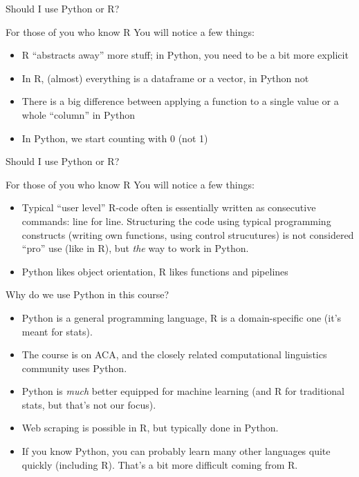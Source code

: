 \begin{frame}{Should I use Python or R?}
	\begin{block}{For those of you who know R}
		You will notice a few things:
		\begin{itemize}[<+>]
			\item R ``abstracts away'' more stuff; in Python, you need to be a bit more explicit
			\item In R, (almost) everything is a dataframe or a vector, in Python not
			\item There is a big difference between applying a function to a single value or a whole ``column'' in Python
			\item In Python, we start counting with 0 (not 1)
		\end{itemize}

	\end{block}
\end{frame}


\begin{frame}{Should I use Python or R?}
	\begin{block}{For those of you who know R}
		You will notice a few things:
		\begin{itemize}[<+>]
			\item Typical ``user level'' R-code often is essentially written as consecutive commands: line for line. Structuring the code using typical programming constructs (writing own functions, using control strucutures) is not considered ``pro'' use (like in R), but \emph{the} way to work in Python.
			\item Python likes object orientation, R likes functions and pipelines
		\end{itemize}
		
	\end{block}
\end{frame}



\begin{frame}{Why do we use Python in this course?}
\begin{itemize}
	\item Python is a general programming language, R is a domain-specific one (it's meant for stats).
	\item The course is on ACA, and the closely related computational linguistics community uses Python.
	\item Python is \emph{much} better equipped for machine learning (and R for traditional stats, but that's not our focus).
	\item Web scraping is possible in R, but typically done in Python.
	\item If you know Python, you can probably learn many other languages quite quickly (including R). That's a bit more difficult coming from R.
\end{itemize}
	
\end{frame}



